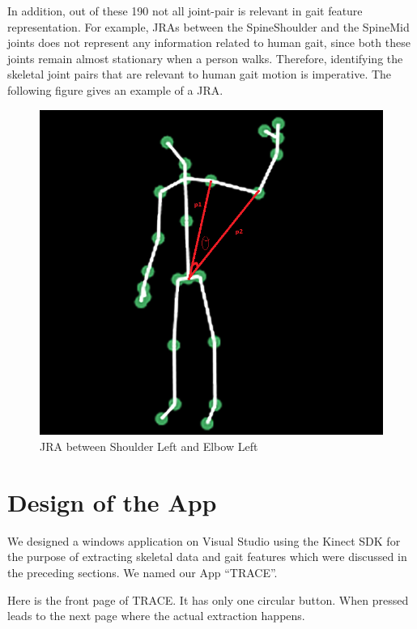 \noindent In addition, out of these 190 not all joint-pair is relevant in gait feature representation. For example, JRAs between the SpineShoulder and the SpineMid joints does not represent any information related to human gait, since both these joints remain almost stationary when a person walks. Therefore, identifying the skeletal joint pairs that are relevant to human gait motion is imperative. The following figure gives an example of a JRA. \\
\begin{figure}[h]
\centering
\includegraphics[scale=0.5]{angle.png}
\caption{JRA between Shoulder Left and Elbow Left}
\end{figure}

\clearpage
\section{Design of the App } \label{ Design of the App} 
\noindent We designed a windows application on Visual Studio using the Kinect SDK for the purpose of extracting skeletal data and gait features which were discussed in the preceding sections. We named our App “TRACE”.

\noindent Here is the front page of TRACE. It has only one circular button. When pressed leads to the next page where the actual extraction happens.

